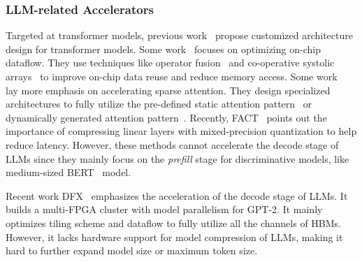 \subsubsection{LLM-related Accelerators}
Targeted at transformer models, previous work~\cite{li2020ftrans,ham2020a3,isca2021elsa,micro2021sanger,wang2021spatten,micro2022DFX,micro2022bufferfly,hpca23flat,isca2023fact,wang2023cosa} propose customized architecture design for transformer models. Some work~\cite{micro2021sanger,wang2023cosa} focuses on optimizing on-chip dataflow. They use techniques like operator fusion~\citep{micro2021sanger} and co-operative systolic arrays~\citep{wang2023cosa} to improve on-chip data reuse and reduce memory access. 
Some work~\cite{CTA2023, micro2021sanger,wang2021spatten,micro2022bufferfly,li2020ftrans,isca2021elsa} lay more emphasis on accelerating sparse attention.
They design specialized architectures to fully utilize the pre-defined static attention pattern~\cite{micro2022bufferfly,li2020ftrans} or dynamically generated attention pattern~\cite{isca2023fact,CTA2023,wang2021spatten,micro2021sanger}.
Recently, FACT~\cite{isca2023fact} points out the importance of compressing linear layers with mixed-precision quantization to help reduce latency.
However, these methods cannot accelerate the decode stage of LLMs since they mainly focus on the \textit{prefill} stage for discriminative models, like medium-sized BERT~\cite{devlin2019bert} model.

Recent work DFX~\cite{micro2022DFX} emphasizes the acceleration of the decode stage of LLMs.
It builds a multi-FPGA cluster with model parallelism for GPT-2. It mainly optimizes tiling scheme and dataflow to fully utilize all the channels of HBMs. However, it lacks hardware support for model compression of LLMs, making it hard to further expand model size or maximum token size.

